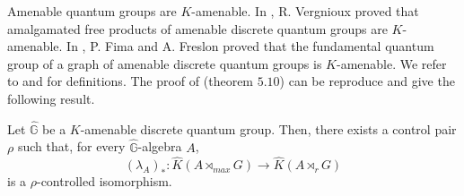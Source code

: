 Amenable quantum groups are $K$-amenable. In \cite{VergniouxKamenability}, R. Vergnioux proved that amalgamated free products of amenable discrete quantum groups are $K$-amenable. In \cite{FimaGraphs}, P. Fima and A. Freslon proved that the fundamental quantum group of a graph of amenable discrete quantum groups is $K$-amenable. We refer to \cite{VergniouxKamenability} and \cite{FimaGraphs} for definitions. The proof of \cite{OY2} (theorem $5.10$) can be reproduce and give the following result.

\begin{prop}\label{QGK}
Let $\hat{\mathbb G}$ be a $K$-amenable discrete quantum group. Then, there exists a control pair $\rho$ such that, for every $\hat{\mathbb G}$-algebra $A$,
\[(\lambda_A)_* : \hat K(A\rtimes_{max} G) \rightarrow \hat K(A\rtimes_r G) \]
is a $\rho$-controlled isomorphism.
\end{prop}





























   
